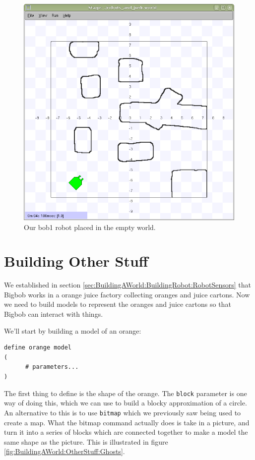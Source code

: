 \documentclass[a4paper]{report}
\begin{document}
\begin{figure}
	\centering
	\includegraphics[width=0.7\linewidth]{./pics/robot_building/final_robot_build.png} 
	\caption{Our bob1 robot placed in the empty world.}
	\label{fig:BuildingAWorld:BuildingRobot:RobotSensors:FinalRobot}
\end{figure}




\section{Building Other Stuff} \label{sec:BuildingAWorld:OtherStuff}
We established in section \ref{sec:BuildingAWorld:BuildingRobot:RobotSensors} that Bigbob works in a orange juice factory collecting oranges and juice cartons. Now we need to build models to represent the oranges and juice cartons so that Bigbob can interact with things.

We'll start by building a model of an orange:
\begin{verbatim}
define orange model
(
      # parameters...
)
\end{verbatim}
The first thing to define is the shape of the orange. The \verb|block| parameter is one way of doing this, which we can use to build a blocky approximation of a circle. An alternative to this is to use \verb|bitmap| which we previously saw being used to create a map. What the bitmap command actually does is take in a picture, and turn it into a series of blocks which are connected together to make a model the same shape as the picture. This is illustrated in figure \ref{fig:BuildingAWorld:OtherStuff:Ghosts}. 
\end{document}
